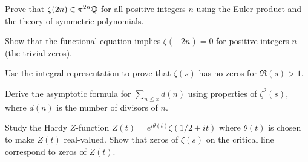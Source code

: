 \begin{exercise}
Prove that $\zeta(2n) \in \pi^{2n} \mathbb{Q}$ for all positive integers $n$ using the Euler product and the theory of symmetric polynomials.
\end{exercise}

\begin{exercise}
Show that the functional equation implies $\zeta(-2n) = 0$ for positive integers $n$ (the trivial zeros).
\end{exercise}

\begin{exercise}
Use the integral representation to prove that $\zeta(s)$ has no zeros for $\Re(s) > 1$.
\end{exercise}

\begin{exercise}
Derive the asymptotic formula for $\sum_{n \leq x} d(n)$ using properties of $\zeta^2(s)$, where $d(n)$ is the number of divisors of $n$.
\end{exercise}

\begin{exercise}[Advanced]
Study the Hardy $Z$-function $Z(t) = e^{i\theta(t)} \zeta(1/2 + it)$ where $\theta(t)$ is chosen to make $Z(t)$ real-valued. Show that zeros of $\zeta(s)$ on the critical line correspond to zeros of $Z(t)$.
\end{exercise}

